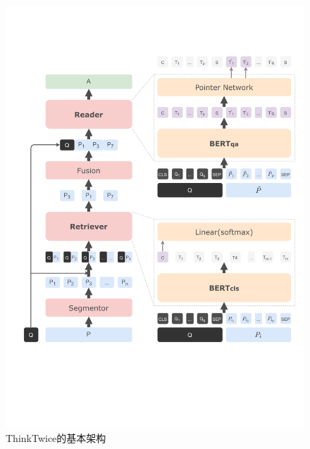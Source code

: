 \begin{figure}
    \centering
        \includegraphics[scale=0.8]{figure/3-1.pdf}
    \caption{ThinkTwice的基本架构}
    \label{fig:3-1}
\end{figure}
